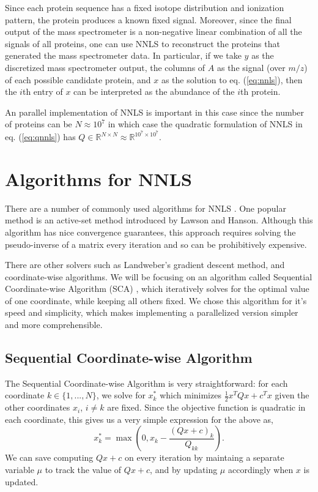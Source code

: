\documentclass{article}
\begin{document}
Since each protein sequence has a fixed isotope distribution and ionization pattern, the protein produces a known fixed signal. Moreover, since the final output of the mass spectrometer is a non-negative linear combination of all the signals of all proteins, one can use NNLS to reconstruct the proteins that generated the mass spectrometer data. In particular, if we take $y$ as the discretized mass spectrometer output, the columns of $A$ as the signal (over $m/z$) of each possible candidate protein, and $x$ as the solution to eq. (\ref{eq:nnls}), then the $i$th entry of $x$ can be interpreted as the abundance of the $i$th protein.

An parallel implementation of NNLS is important in this case since the number of proteins can be $N \approx 10^7$ in which case the quadratic formulation of NNLS in eq. (\ref{eq:qnnls}) has $Q \in \mathbb R^{N \times N} \approx \mathbb R^{10^7 \times 10^7}$.

\section{Algorithms for NNLS}
There are a number of commonly used algorithms for NNLS \cite{chen}. One popular method is an active-set method introduced by Lawson and Hanson. Although this algorithm has nice convergence guarantees, this approach requires solving the pseudo-inverse of a matrix every iteration \cite{lawson} and so can be prohibitively expensive.

There are other solvers such as Landweber's gradient descent method, and coordinate-wise algorithms. We will be focusing on an algorithm called Sequential Coordinate-wise Algorithm (SCA) \cite{franc}, which iteratively solves for the optimal value of one coordinate, while keeping all others fixed. We chose this algorithm for it's speed and simplicity, which makes implementing a parallelized version simpler and more comprehensible.

\subsection{Sequential Coordinate-wise Algorithm}
The Sequential Coordinate-wise Algorithm is very straightforward: for each coordinate $k \in \{1,...,N\}$, we solve for $x_k^*$ which minimizes $\frac12 x^T Q x + c^T x$ given the other coordinates $x_i$, $i \neq k$ are fixed. Since the objective function is quadratic in each coordinate, this gives us a very simple expression for the above as,
\begin{equation}\label{eq:sca_solve}
    x_k^* = \max\left( 0, x_k - \frac{(Qx + c)_k}{Q_{kk}}\right).
\end{equation}
We can save computing $Qx+c$ on every iteration by maintaing a separate variable $\mu$ to track the value of $Qx+c$, and by updating $\mu$ accordingly when $x$ is updated.
\end{document}
